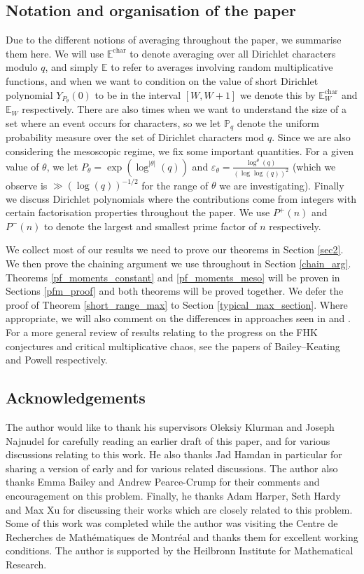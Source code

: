 \documentclass[10pt,a4paper]{amsart}
\numberwithin{equation}{section}
\begin{document}
\subsection{Notation and organisation of the paper}
Due to the different notions of averaging throughout the paper, we summarise them here. We will use $\mathbb{E}^{\text{char}}$ to denote averaging over all Dirichlet characters modulo $q$, and simply $\mathbb{E}$ to refer to averages involving random multiplicative functions, and when we want to condition on the value of short Dirichlet polynomial $Y_{P_\theta}(0)$ to be in the interval $[W,W+1]$ we denote this by $\mathbb{E}_{W}^{\text{char}}$ and $\mathbb{E}_W$ respectively. There are also times when we want to understand the size of a set where an event occurs for characters, so we let $\mathbb{P}_q$ denote the uniform probability measure over the set of Dirichlet characters mod $q$. Since we are also considering the mesoscopic regime, we fix some important quantities. For a given value of $\theta$, we let $P_\theta = \exp(\log^{|\theta|}(q))$ and $\varepsilon_\theta = \frac{\log^\theta(q)}{(\log\log(q))^2}$ (which we observe is $\gg (\log(q))^{-1/2}$ for the range of $\theta$ we are investigating). Finally we discuss Dirichlet polynomials where the contributions come from integers with certain factorisation properties throughout the paper. We use $P^+(n)$ and $P^{-}(n)$ to denote the largest and smallest prime factor of $n$ respectively.\par
We collect most of our results we need to prove our theorems in Section \ref{sec2}. We then prove the chaining argument we use throughout in Section \ref{chain_arg}. Theorems \ref{pf_moments_constant} and \ref{pf_moments_meso} will be proven in Sections \ref{pfm_proof} and both theorems will be proved together. We defer the proof of Theorem \ref{short_range_max} to Section \ref{typical_max_section}. Where appropriate, we will also comment on the differences in approaches seen in \cite{harper2019partition} and \cite{abr20}. For a more general review of results relating to the progress on the FHK conjectures and critical multiplicative chaos, see the papers of Bailey--Keating \cite{bk22} and Powell \cite{powell22} respectively.
\subsection*{Acknowledgements}
The author would like to thank his supervisors Oleksiy Klurman and Joseph Najnudel for carefully reading an earlier draft of this paper, and for various discussions relating to this work. He also thanks Jad Hamdan in particular for sharing a version of \cite{ah24} early and for various related discussions. The author also thanks Emma Bailey and Andrew Pearce-Crump for their comments and encouragement on this problem. Finally, he thanks Adam Harper, Seth Hardy and Max Xu for discussing their works which are closely related to this problem. Some of this work was completed while the author was visiting the Centre de Recherches de Math\'{e}matiques de Montr\'{e}al and thanks them for excellent working conditions. The author is supported by the Heilbronn Institute for Mathematical Research.
\end{document}

